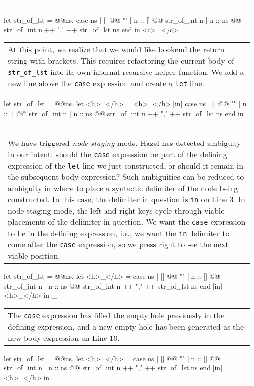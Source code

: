 \documentclass[runningheads]{llncs}
\newcommand{\Hazel}{\textsf{Hazel}\xspace}
\begin{document}
	\[\vdots\]
\begin{hazel}
let str_of_lst = 
	@\lam @ns.{
		case ns
		| []      @\casearrow @ ""
		| n :: [] @\casearrow @ str_of_int n		
		| n :: ns @\casearrow @ str_of_int n ++ "," ++ str_of_lst ns
		end
	}
in
<c>_</c>
\end{hazel}
	\begin{tabular}{|p{\linewidth}}
	At this point, we realize that we would like bookend the return string
	with brackets. This requires refactoring the current body of
	\texttt{str\_of\_lst} into its own internal recursive helper function.
	We add a new line above the \texttt{case} expression and create a
	\texttt{let} line.
	\end{tabular}
\begin{hazel}
let str_of_lst = 
	@\lam @ns.{
		let <h>_</h> = <h>_</h> [in]
		case ns
		| []      @\casearrow @ ""
		| n :: [] @\casearrow @ str_of_int n		
		| n :: ns @\casearrow @ str_of_int n ++ "," ++ str_of_lst ns
		end
	}
in
_
\end{hazel}
	\begin{tabular}{|p{\linewidth}}
	We have triggered \emph{node staging} mode. \Hazel has detected
	ambiguity in our intent: should the \texttt{case} expression be part of
	the defining expression of the \texttt{let} line we just constructed,
	or should it remain in the subsequent body expression? Such ambiguities
	can be reduced to ambiguity in where to place a syntactic delimiter
	of the node being constructed. In this case, the delimiter in question is
	\texttt{in} on Line 3. In node staging mode, the left and right
	keys cycle through viable placements of the delimiter in question.
	We want the \texttt{case} expression to be in the defining expression,
	i.e., we want the \texttt{in} delimiter to come after the \texttt{case}
	expression, so we press right to see the next viable position.
	\end{tabular}
\begin{hazel}
let str_of_lst = 
	@\lam @ns.{
		let <h>_</h> =
			case ns
			| []      @\casearrow @ ""
			| n :: [] @\casearrow @ str_of_int n		
			| n :: ns @\casearrow @ str_of_int n ++ "," ++ str_of_lst ns
			end
		[in]
		<h>_</h>
	}
in
_
\end{hazel}
	\begin{tabular}{|p{\linewidth}}
	The \texttt{case} expression has filled the empty hole previously in 
	the defining expression, and a new empty hole has been generated as the
	new body expression on Line 10.
	\end{tabular}
\begin{hazel}
let str_of_lst = 
	@\lam @ns.{
		let <h>_</h> =
			case ns
			| []      @\casearrow @ ""
			| n :: [] @\casearrow @ str_of_int n		
			| n :: ns @\casearrow @ str_of_int n ++ "," ++ str_of_lst ns
			end
		[in]
		<h>_</h>
	}
in
_
\end{hazel}
\end{document}
